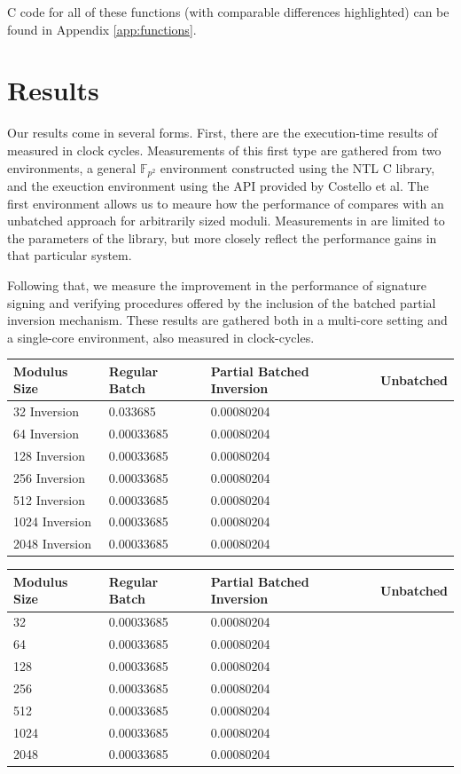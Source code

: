 C code for all of these functions (with comparable differences highlighted) can be found in Appendix \ref{app:functions}.

\section{Results}

Our results come in several forms. First, there are the execution-time results of  measured in clock cycles. Measurements of this first type are gathered from two environments, a general $\mathbb{F}_{p^2}$ environment constructed using the NTL C library, and the \sidh exeuction environment using the API provided by Costello et al. The first environment allows us to meaure how the performance of  compares with an unbatched approach for arbitrarily sized moduli. Measurements in \sidh are limited to the parameters of the library, but more closely reflect the performance gains in that particular system.

Following that, we measure the improvement in the performance of signature signing and verifying procedures offered by the inclusion of the batched partial inversion mechanism. These results are gathered both in a multi-core setting and a single-core environment, also measured in clock-cycles.  


\begin{center}
\begin{tabular}{@{}llll@{}}
	\toprule
	Modulus Size & Regular Batch & Partial Batched Inversion & Unbatched \\
	\midrule
	32 Inversion & 0.033685 & 0.00080204\\
	64 Inversion & 0.00033685 & 0.00080204\\
	128 Inversion & 0.00033685 & 0.00080204\\
	256 Inversion & 0.00033685 & 0.00080204\\
	512 Inversion & 0.00033685 & 0.00080204\\
	1024 Inversion & 0.00033685 & 0.00080204\\
	2048 Inversion & 0.00033685 & 0.00080204\\
	\bottomrule
\end{tabular}
\end{center}

\begin{center}
\begin{tabular}{@{}llll@{}}
	\toprule
	Modulus Size & Regular Batch & Partial Batched Inversion & Unbatched \\
	\midrule
	32 & 0.00033685 & 0.00080204\\
	64 & 0.00033685 & 0.00080204\\
	128 & 0.00033685 & 0.00080204\\
	256 & 0.00033685 & 0.00080204\\
	512 & 0.00033685 & 0.00080204\\
	1024 & 0.00033685 & 0.00080204\\
	2048 & 0.00033685 & 0.00080204\\
	\bottomrule
\end{tabular}
\end{center}

